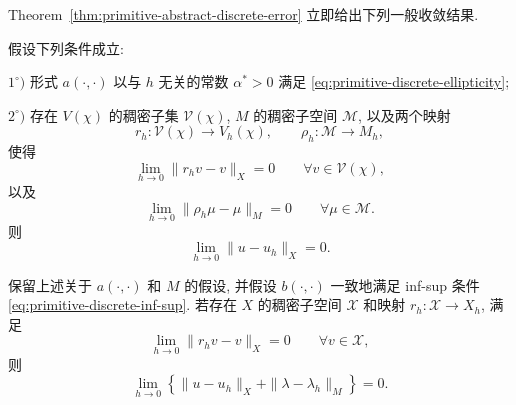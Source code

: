 Theorem~\ref{thm:primitive-abstract-discrete-error} 立即给出下列一般收敛结果.

\setcounter{statement}{0}
\begin{Corollary}\label{cor:primitive-general-velocity-convergence}
假设下列条件成立:

$1^\circ)$ 形式 $a(\cdot,\cdot)$ 以与 $h$ 无关的常数 $\alpha^*>0$
满足 \eqref{eq:primitive-discrete-ellipticity};

$2^\circ)$ 存在 $V(\chi)$ 的稠密子集 $\mathcal V(\chi)$,
$M$ 的稠密子空间 $\mathcal M$, 以及两个映射
\[
r_h:\mathcal V(\chi)\longrightarrow V_h(\chi),
\qquad
\rho_h:\mathcal M\longrightarrow M_h,
\]
使得
\[
\lim_{h\to0}\|r_hv-v\|_X=0
\qquad\forall v\in\mathcal V(\chi),
\]
以及
\[
\lim_{h\to0}\|\rho_h\mu-\mu\|_M=0
\qquad\forall\mu\in\mathcal M.
\]
则
\[
\lim_{h\to0}\|u-u_h\|_X=0.
\]
\end{Corollary}

\setcounter{statement}{1}
\begin{Corollary}\label{cor:primitive-general-mixed-convergence}
保留上述关于 $a(\cdot,\cdot)$ 和 $M$ 的假设, 并假设
$b(\cdot,\cdot)$ 一致地满足 inf-sup 条件
\eqref{eq:primitive-discrete-inf-sup}. 若存在 $X$ 的稠密子空间
$\mathcal X$ 和映射 $r_h:\mathcal X\to X_h$, 满足
\[
\lim_{h\to0}\|r_hv-v\|_X=0
\qquad\forall v\in\mathcal X,
\]
则
\[
\lim_{h\to0}\left\{\|u-u_h\|_X+\|\lambda-\lambda_h\|_M\right\}=0.
\]
\end{Corollary}
